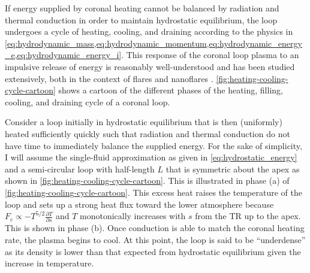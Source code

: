 If energy supplied by coronal heating cannot be balanced by radiation and thermal conduction in order to maintain hydrostatic equilibrium, the loop undergoes a cycle of heating, cooling, and draining according to the physics in \cref{eq:hydrodynamic_mass,eq:hydrodynamic_momentum,eq:hydrodynamic_energy_e,eq:hydrodynamic_energy_i}. This response of the coronal loop plasma to an impulsive release of energy is reasonably well-understood and has been studied extensively, both in the context of flares and nanoflares \citep[e.g.][]{antiochos_influence_1976,antiochos_evaporative_1978,cargill_implications_1994,cargill_cooling_1995,cargill_nanoflare_2004,bradshaw_cooling_2005,bradshaw_reinterpretation_2008,bradshaw_new_2010,bradshaw_cooling_2010}. \autoref{fig:heating-cooling-cycle-cartoon} shows a cartoon of the different phases of the heating, filling, cooling, and draining cycle of a coronal loop.

Consider a loop initially in hydrostatic equilibrium that is then (uniformly) heated sufficiently quickly such that radiation and thermal conduction do not have time to immediately balance the supplied energy. For the sake of simplicity, I will assume the single-fluid approximation as given in \autoref{eq:hydrostatic_energy} and a semi-circular loop with half-length $L$ that is symmetric about the apex as shown in \autoref{fig:heating-cooling-cycle-cartoon}. This is illustrated in phase (a) of \autoref{fig:heating-cooling-cycle-cartoon}. This excess heat raises the temperature of the loop and sets up a strong heat flux toward the lower atmosphere because $F_c \propto -T^{5/2}\frac{\partial T}{\partial s}$ and $T$ monotonically increases with $s$ from the TR up to the apex. This is shown in phase (b). Once conduction is able to match the coronal heating rate, the plasma begins to cool. At this point, the loop is said to be ``underdense'' as its density is lower than that expected from hydrostatic equilibrium given the increase in temperature.

